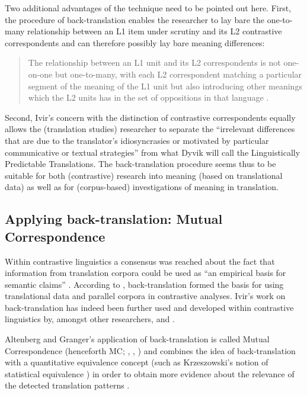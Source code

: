 Two additional advantages of the technique need to be pointed out here. First, the procedure of back-translation enables the researcher to lay bare the one-to-many relationship between an L1 item under scrutiny and its L2 contrastive correspondents and can therefore possibly lay bare meaning differences:

\begin{quote}
The relationship between an L1 unit and its L2 correspondents is not one-on-one but one-to-many, with each L2 correspondent matching a particular segment of the meaning of the L1 unit but also introducing other meanings which the L2 units has in the set of oppositions in that language \citep[177]{ivir_translation-based_1983}.
\end{quote}

Second, Ivir’s concern with the distinction of contrastive correspondents equally allows the (translation studies) researcher to separate the “irrelevant differences that are due to the translator’s idiosyncrasies or motivated by particular communicative or textual strategies” \citep[7:17]{altenberg_recent_2002} from what Dyvik will call the Linguistically Predictable Translations. The back-translation procedure seems thus to be suitable for both (contrastive) research into meaning (based on translational data) as well as for (corpus-based) investigations of meaning in translation.

\subsection{Applying back-translation: Mutual Correspondence}
\label{sec:2.3.3}  
Within contrastive linguistics a consensus was reached about the fact that information from translation corpora could be used as “an empirical basis for semantic claims” \citep[758]{noel_translations_2003}. According to \citet[24-28]{ebeling_patterns_2013}, back-translation formed the basis for using translational data and parallel corpora in contrastive analyses. Ivir’s work on back-translation has indeed been further used and developed within contrastive linguistics by, amongst other researchers, \citet{hasselgard_adverbial_1999} and \citet{altenberg_recent_2002}.

Altenberg and Granger’s application of back-translation is called Mutual Correspondence (henceforth MC; \citealt[254 ff.]{hasselgard_adverbial_1999}, \citealt[9]{altenberg_correspondence_2007}, \citealt[7:18]{altenberg_recent_2002}) and combines the idea of back-translation with a quantitative equivalence concept (such as Krzeszowski’s notion of statistical equivalence \citep[27-28]{krzeszowski_contrasting_1990}) in order to obtain more evidence about the relevance of the detected translation patterns \citep[17]{altenberg_recent_2002}.

